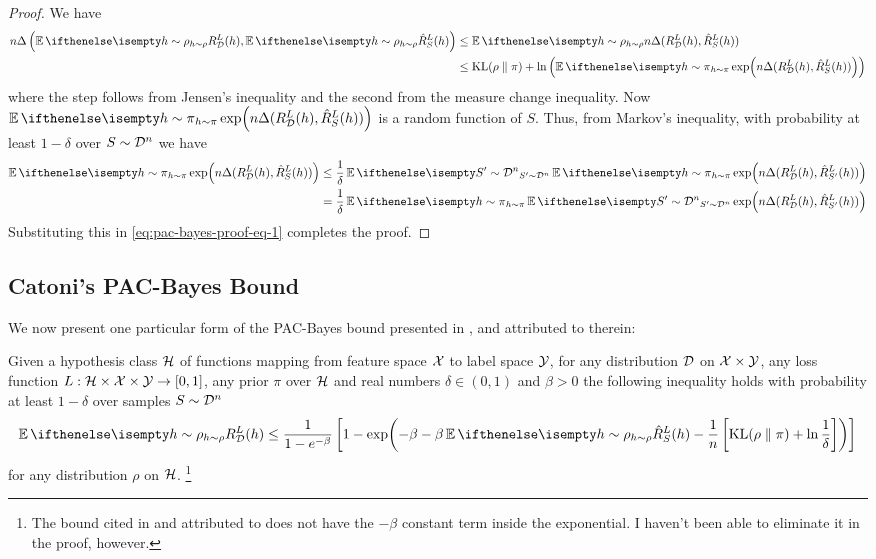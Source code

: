 \begin{proof}
  We have
  \begin{equation}
    \label{eq:pac-bayes-proof-eq-1}
    \begin{split}
      n \Delta\left(\Ev[h \sim \rho]{R_\CD^L(h)}, \Ev[h \sim
      \rho]{\hat{R}_S^L(h)}\right) &\leq \Ev[h \sim \rho]{n \Delta(R_\CD^L(h),
      \hat{R}_S^L(h))} \\
      &\leq \KL{\rho}{\pi} + \ln\left(\Ev[h \sim \pi]{\exp(n \Delta(R_\CD^L(h),
      \hat{R}_S^L(h)))}\right)
    \end{split}
  \end{equation}
  where the step follows from Jensen's inequality and the second from the
  measure change inequality. Now $\Ev[h \sim \pi]{\exp(n \Delta(R_\CD^L(h),
  \hat{R}_S^L(h)))}$ is a random function of $S$. Thus, from Markov's
  inequality, with probability at least $1 - \delta$ over $S \sim \mathcal{D}^n$ we have
  \begin{equation}
    \begin{split}
      \Ev[h \sim \pi]{\exp(n \Delta(R_\CD^L(h), \hat{R}_S^L(h)))}
      &\leq \frac{1}{\delta} \Ev[S' \sim \CD^n]{\Ev[h \sim \pi]{\exp(n
      \Delta(R_\CD^L(h), \hat{R}_{S'}^L(h)))}} \\
      &= \frac{1}{\delta} \Ev[h \sim \pi]{\Ev[S' \sim \CD^n]{\exp(n
      \Delta(R_\CD^L(h), \hat{R}_{S'}^L(h)))}}
    \end{split}
  \end{equation}
  Substituting this in \eqref{eq:pac-bayes-proof-eq-1} completes the proof.
\end{proof}

\subsection{Catoni's PAC-Bayes Bound}

We now present one particular form of the PAC-Bayes bound presented in
\cite{germain2016pac}, and attributed to \cite{catoni2007pac} therein:

\begin{theorem}
  \label{thm:catoni}
  Given a hypothesis class $\mathcal{H}$ of functions mapping from feature space $\mathcal{X}$
  to label space $\mathcal{Y}$, for any distribution $\mathcal{D}$ on $\mathcal{X} \times \mathcal{Y}$, any loss
  function $L : \mathcal{H} \times \mathcal{X} \times \mathcal{Y} \to [0, 1]$, any prior $\pi$ over
  $\mathcal{H}$ and real numbers $\delta \in (0, 1)$ and $\beta > 0$ the following
  inequality holds with probability at least $1 - \delta$ over samples $S \sim
  \mathcal{D}^n$
  \begin{equation}
    \label{eq:catoni-bound-unit}
    \Ev[h \sim \rho]{R_\CD^L(h)} \leq \frac{1}{1 - e^{-\beta}} \left[1 -
    \exp(-\beta - \beta \Ev[h \sim \rho]{\hat{R}_S^L(h)} - \frac{1}{n}
    \left[\KL{\rho}{\pi} + \ln \frac{1}{\delta}\right])\right]
  \end{equation}
  for any distribution $\rho$ on $\mathcal{H}$. \footnote{The bound cited in
  \cite{germain2016pac} and attributed to \cite{catoni2007pac} does not have the
  $-\beta$ constant term inside the exponential. I haven't been able to
  eliminate it in the proof, however.}
\end{theorem}

